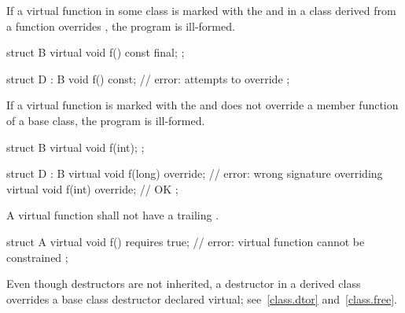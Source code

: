 \pnum
If a virtual function  in some class  is marked with the
  and in a class  derived from 
a function  overrides , the program is ill-formed.
\begin{example}
\begin{codeblock}
struct B {
  virtual void f() const final;
};

struct D : B {
  void f() const;   // error:  attempts to override  
};
\end{codeblock}
\end{example}

\pnum
If a virtual function is marked with the   and
does not override a member function of a base class, the program is ill-formed.
\begin{example}
\begin{codeblock}
struct B {
  virtual void f(int);
};

struct D : B {
  virtual void f(long) override;        // error: wrong signature overriding 
  virtual void f(int) override;         // OK
};
\end{codeblock}
\end{example}

\pnum
A virtual function shall not have a trailing .
\begin{example}
\begin{codeblock}
struct A {
  virtual void f() requires true;       // error: virtual function cannot be constrained
};
\end{codeblock}
\end{example}

\pnum
Even though destructors are not inherited, a destructor in a derived
class overrides a base class destructor declared virtual;
see~\ref{class.dtor} and~\ref{class.free}.


